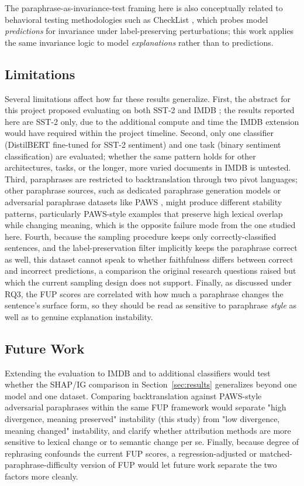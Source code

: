 The paraphrase-as-invariance-test framing here is also conceptually
related to behavioral testing methodologies such as CheckList
\citep{ribeiro2020beyond}, which probes model \emph{predictions} for
invariance under label-preserving perturbations; this work applies the
same invariance logic to model \emph{explanations} rather than to
predictions.

\subsection{Limitations}

Several limitations affect how far these results generalize. First, the
abstract for this project proposed evaluating on both SST-2 and IMDB
\citep{maas2011learning}; the results reported here are SST-2 only, due
to the additional compute and time the IMDB extension would have
required within the project timeline. Second, only one classifier
(DistilBERT fine-tuned for SST-2 sentiment) and one task (binary
sentiment classification) are evaluated; whether the same pattern holds
for other architectures, tasks, or the longer, more varied documents in
IMDB is untested. Third, paraphrases are restricted to backtranslation
through two pivot languages; other paraphrase sources, such as
dedicated paraphrase generation models or adversarial paraphrase
datasets like PAWS \citep{zhang2019paws}, might produce different
stability patterns, particularly PAWS-style examples that preserve high
lexical overlap while changing meaning, which is the opposite failure
mode from the one studied here. Fourth, because the sampling procedure
keeps only correctly-classified sentences, and the label-preservation
filter implicitly keeps the paraphrase correct as well, this dataset
cannot speak to whether faithfulness differs between correct and
incorrect predictions, a comparison the original research questions
raised but which the current sampling design does not support. Finally,
as discussed under RQ3, the FUP scores are correlated with how much a
paraphrase changes the sentence's surface form, so they should be read
as sensitive to paraphrase \emph{style} as well as to genuine explanation
instability.

\subsection{Future Work}

Extending the evaluation to IMDB and to additional classifiers would
test whether the SHAP/IG comparison in Section~\ref{sec:results}
generalizes beyond one model and one dataset. Comparing backtranslation
against PAWS-style adversarial paraphrases \citep{zhang2019paws} within
the same FUP framework would separate "high divergence, meaning
preserved" instability (this study) from "low divergence, meaning
changed" instability, and clarify whether attribution methods are more
sensitive to lexical change or to semantic change per se. Finally,
because degree of rephrasing confounds the current FUP scores, a
regression-adjusted or matched-paraphrase-difficulty version of FUP
would let future work separate the two factors more cleanly.
